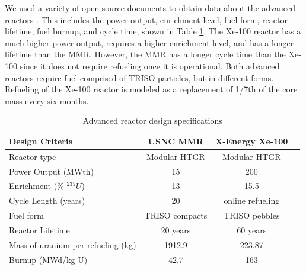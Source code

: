 \documentclass[preprint]{elsarticle}
\begin{document}
We used a variety of open-source documents to obtain data about the advanced reactors
\cite{mitchell_usnc_2020, harlan_x-energy_2018, hussain_advances_2018}. 
This includes 
the power output, enrichment level, fuel form, reactor lifetime, fuel 
burnup, and cycle time, shown in Table \ref{tab:reactor_summary}. 
The Xe-100 reactor has a much higher power output, requires a higher enrichment 
level, and has a longer lifetime than the \gls{MMR}. However, the 
\gls{MMR} has a longer cycle time than the Xe-100 since it does not require 
refueling once it is operational. Both advanced reactors require fuel 
comprised of \gls{TRISO} particles, but in different forms. Refueling 
of the Xe-100 reactor is modeled as a replacement of 1/7th of the core mass 
every six months. 

\begin{table}[ht]
        \caption{Advanced reactor design specifications}
        \label{tab:reactor_summary}
        \begin{tabular}{l c c c}
            \hline
            Design Criteria & \gls{USNC} \gls{MMR} \cite{mitchell_usnc_2020}& 
                X-Energy Xe-100 \cite{harlan_x-energy_2018,hussain_advances_2018} \\\hline
            Reactor type & Modular HTGR & Modular HTGR \\
            Power Output (MWth) & 15 & 200 \\
            Enrichment (\% $^{235}U$) & 13 & 15.5 \\
            Cycle Length (years) & 20 & online refueling\\
            Fuel form & \gls{TRISO} compacts & \gls{TRISO} pebbles\\
            Reactor Lifetime & 20 years & 60 years \\
            Mass of uranium per refueling (kg) & 1912.9 & 223.87 \\
            Burnup (MWd/kg U) & 42.7 & 163 \\
            \hline
        \end{tabular}
    \end{table}
\end{document}
